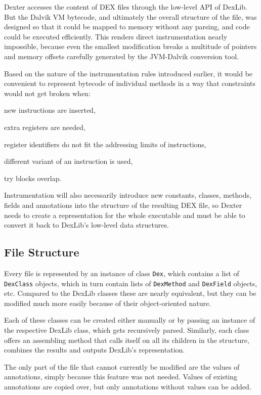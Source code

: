 \documentclass[12pt,twoside,notitlepage]{report}
\begin{document}
Dexter accesses the content of DEX files through the low-level API of DexLib. But the Dalvik VM bytecode, and ultimately the overall structure of the file, was designed so that it could be mapped to memory without any parsing, and code could be executed efficiently. This renders direct instrumentation nearly impossible, because even the smallest modification breaks a multitude of pointers and memory offsets carefully generated by the JVM-Dalvik conversion tool.

Based on the nature of the instrumentation rules introduced earlier, it would be convenient to represent bytecode of individual methods in a way that constraints would not get broken when:
\begin{inparaenum}[(i)]
\item new instructions are inserted,
\item extra registers are needed,
\item register identifiers do not fit the addressing limits of instructions,
\item different variant of an instruction is used,
\item try blocks overlap.
\end{inparaenum}
Instrumentation will also necessarily introduce new constants, classes, methods, fields and annotations into the structure of the resulting DEX file, so Dexter needs to create a representation for the whole executable and must be able to convert it back to DexLib's low-level data structures.

\subsection{File Structure}

Every file is represented by an instance of class \verb$Dex$, which contains a list of \verb$DexClass$ objects, which in turn contain lists of \verb$DexMethod$ and \verb$DexField$ objects, etc. Compared to the DexLib classes these are nearly equivalent, but they can be modified much more easily because of their object-oriented nature.

Each of these classes can be created either manually or by passing an instance of the respective DexLib class, which gets recursively parsed. Similarly, each class offers an assembling method that calls itself on all its children in the structure, combines the results and outputs DexLib's representation.

The only part of the file that cannot currently be modified are the values of annotations, simply because this feature was not needed. Values of existing annotations are copied over, but only annotations without values can be added. 
\end{document}
